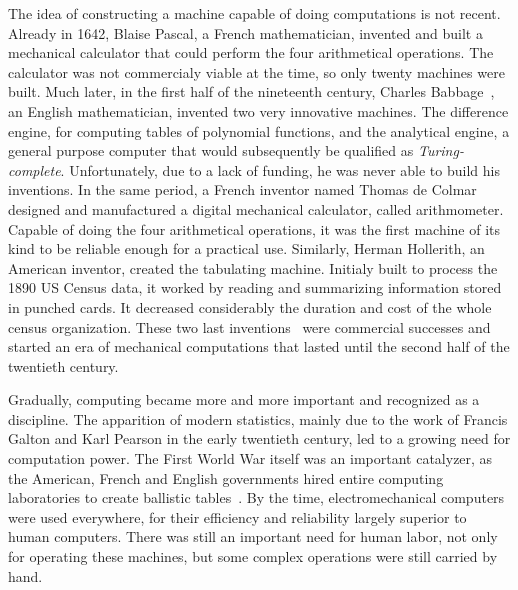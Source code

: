         The idea of constructing a machine capable of doing computations is not recent. Already in 1642, Blaise Pascal,
        a French mathematician, invented and built a mechanical calculator that could perform the four arithmetical
        operations. The calculator was not commercialy viable at the time, so only twenty machines were built. Much
        later, in the first half of the nineteenth century, Charles Babbage~\cite[Chapters~2-3]{human_computers}, an
        English mathematician, invented two very innovative machines. The difference engine, for computing tables of
        polynomial functions, and the analytical engine, a general purpose computer that would subsequently be qualified
        as \emph{Turing-complete}. Unfortunately, due to a lack of funding, he was never able to build his inventions.
        In the same period, a French inventor named Thomas de Colmar designed and manufactured a digital
        mechanical calculator, called arithmometer. Capable of doing the four arithmetical operations, it was the first
        machine of its kind to be reliable enough for a practical use.  Similarly, Herman Hollerith, an American
        inventor, created the tabulating machine. Initialy built to process the 1890 US Census data, it worked by
        reading and summarizing information stored in punched cards. It decreased considerably the duration and cost of
        the whole census organization. These two last inventions~\cite[Chapter~6]{human_computers} were commercial
        successes and started an era of mechanical computations that lasted until the second half of the twentieth
        century.

        Gradually, computing became more and more important and recognized as a discipline. The apparition of modern
        statistics, mainly due to the work of Francis Galton and Karl Pearson in the early twentieth century, led to a
        growing need for computation power. The First World War itself was an important catalyzer, as the American,
        French and English governments hired entire computing laboratories to create ballistic
        tables~\cite[Chapter~10]{human_computers}. By the time, electromechanical computers were used everywhere, for
        their efficiency and reliability largely superior to human computers. There was still an important need for
        human labor, not only for operating these machines, but some complex operations were still carried by hand.

